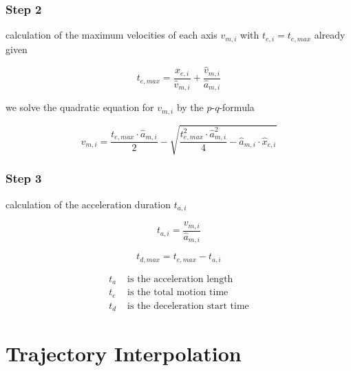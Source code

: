 \documentclass[%
  professionalfonts,%
  xcolor={%
    usenames,%
    dvipsnames,%
    svgnames,%
    table,%
    hyperref%
  }%
]{beamer}
\begin{document}
\subsubsection{Step 2}
\begin{frame}
calculation of the maximum velocities of each axis $v_{m,i}$ with $t_{e,i} = t_{e,max}$ already given

\begin{equation*}
t_{e,max} = \frac{\hat{x}_{e,i}}{\hat{v}_{m,i}}+\frac{\hat{v}_{m,i}}{\hat{a}_{m,i}}
\end{equation*}

we solve the quadratic equation for $v_{m,i}$ by the $p$-$q$-formula

\begin{equation*}
v_{m,i} = \frac{t_{e,max} \cdot \hat{a}_{m,i}}{2}-\sqrt{\frac{t_{e,max}^2 \cdot \hat{a}_{m,i}^2}{4}-\hat{a}_{m,i}\cdot \hat{x}_{e,i}}
\end{equation*}
\end{frame}
  
\subsubsection{Step 3}
\begin{frame}
calculation of the acceleration duration $t_{a,i}$

\begin{equation*}
t_{a,i} = \frac{v_{m,i}}{\hat{a}_{m,i}}
\end{equation*}

\begin{equation}
t_{d,max} = t_{e,max}-t_{a,i}
\end{equation}      

\begin{align*}
t_{a} & \text{ is the acceleration length} \\
t_{e} & \text{ is the total motion time} \\
t_{d} & \text{ is the deceleration start time}
\end{align*}
\end{frame}

\section{Trajectory Interpolation}
\end{document}
